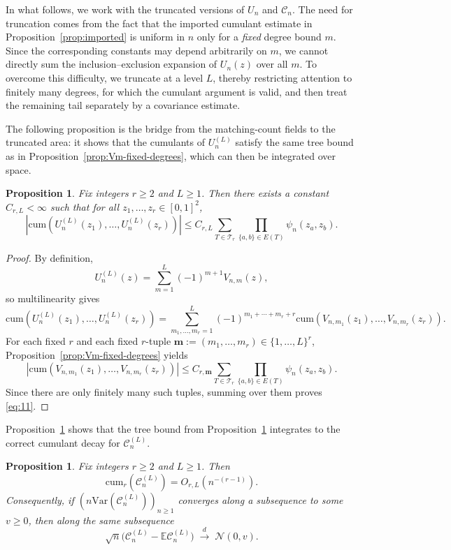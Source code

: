 \documentclass[11pt]{article}
\newtheorem{prop}[thm]{Proposition}
\newcommand{\var}{\mathrm{Var}}
\begin{document}
In what follows, we work with the truncated versions of $U_n$ and $\mathscr{C}_n$. The need for truncation comes from the fact that the imported cumulant estimate in Proposition~\ref{prop:imported} is uniform in $n$ only for a \emph{fixed} degree bound $m$. Since the corresponding constants may depend arbitrarily on $m$, we cannot directly sum the inclusion--exclusion expansion of $U_n(z)$ over all $m$. To overcome this difficulty, we truncate at a level $L$, thereby restricting attention to finitely many degrees, for which the cumulant argument is valid, and then treat the remaining tail separately by a covariance estimate.

The following proposition is the bridge from the matching-count fields to the truncated area: it shows that the cumulants of $U_n^{(L)}$ satisfy the same tree bound as in Proposition~\ref{prop:Vm-fixed-degrees}, which can then be integrated over space.
\begin{prop}
\label{prop:truncated-field-cumulant}
Fix integers $r \ge 2$ and $L \ge 1$. Then there exists a constant $C_{r,L}<\infty$ such that
for all $z_1,\dots,z_r\in[0,1]^2$,
\begin{equation}
\left|
\mathrm{cum}\!\left(U_n^{(L)}(z_1),\dots,U_n^{(L)}(z_r)\right)
\right|
\le
C_{r,L}
\sum_{T\in\mathcal T_r}
\prod_{\{a,b\}\in E(T)} \psi_n(z_a,z_b).
\label{eq:11}
\end{equation}
\end{prop}

\begin{proof}
By definition,
\[
U_n^{(L)}(z)=\sum_{m = 1}^{L}(-1)^{m + 1}V_{n,m}(z),
\]
so multilinearity gives
\[
\mathrm{cum}\!\left(U_n^{(L)}(z_1),\dots,U_n^{(L)}(z_r)\right)
=
\sum_{m_1,\dots,m_r=1}^{L}
(-1)^{m_1+\cdots+m_r+r}
\mathrm{cum}\!\left(V_{n,m_1}(z_1),\dots,V_{n,m_r}(z_r)\right).
\]
For each fixed $r$ and each fixed $r$-tuple $\mathbf{m}:=(m_1,\dots,m_r)\in\{1,\dots,L\}^r$, Proposition~\ref{prop:Vm-fixed-degrees} yields
\[
\left|
\mathrm{cum}\!\left(V_{n,m_1}(z_1),\dots,V_{n,m_r}(z_r)\right)
\right|
\le
C_{r,\mathbf{m}}
\sum_{T\in\mathcal T_r}
\prod_{\{a,b\}\in E(T)} \psi_n(z_a,z_b).
\]
Since there are only finitely many such tuples, summing over them proves \eqref{eq:11}. 
\end{proof}

Proposition~\ref{prop:truncated-area-cumulants} shows that the tree bound from Proposition~\ref{prop:truncated-field-cumulant} integrates to the correct cumulant decay for $\mathscr{C}_n^{(L)}$.
\begin{prop}
\label{prop:truncated-area-cumulants}
Fix integers $r\ge2$ and $L\ge1$. Then
\begin{equation}
\mathrm{cum}_r(\mathscr{C}_n^{(L)}) = O_{r,L}\!\left(n^{-(r-1)}\right).
\label{eq:13}
\end{equation}
Consequently, if $(n\var(\mathscr{C}_n^{(L)}))_{n\ge1}$ converges along a subsequence to some $v\ge0$, then
along the same subsequence
\[
\sqrt n \bigl(\mathscr{C}_n^{(L)}-\mathbb{E} \mathscr{C}_n^{(L)}\bigr)
\;\xrightarrow{d}\;
\mathcal{N}(0,v).
\]
\end{prop}
\end{document}
